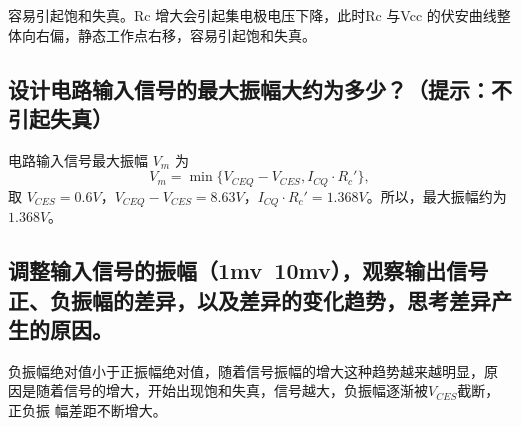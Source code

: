 \documentclass[]{article}
\begin{document}
容易引起饱和失真。Rc 增大会引起集电极电压下降，此时Rc 与Vcc 的伏安曲线整
体向右偏，静态工作点右移，容易引起饱和失真。

\subsection{设计电路输入信号的最大振幅大约为多少？（提示：不引起失真）}

电路输入信号最大振幅 $V_m$ 为
\[ V_m = \min\{ V_{CEQ} - V_{CES}, I_{CQ} \cdot R_c' \}, \]
取 $V_{CES} = 0.6V$，$V_{CEQ} - V_{CES} = 8.63V$，$I_{CQ} \cdot R_c' = 1.368V$。所以，最大振幅约为 $1.368V$。

\subsection{调整输入信号的振幅（1mv~10mv），观察输出信号正、负振幅的差异，以及差异的变化趋势，思考差异产生的原因。}

负振幅绝对值小于正振幅绝对值，随着信号振幅的增大这种趋势越来越明显，原
因是随着信号的增大，开始出现饱和失真，信号越大，负振幅逐渐被$ V_{CES} $截断，正负振
幅差距不断增大。
\end{document}
